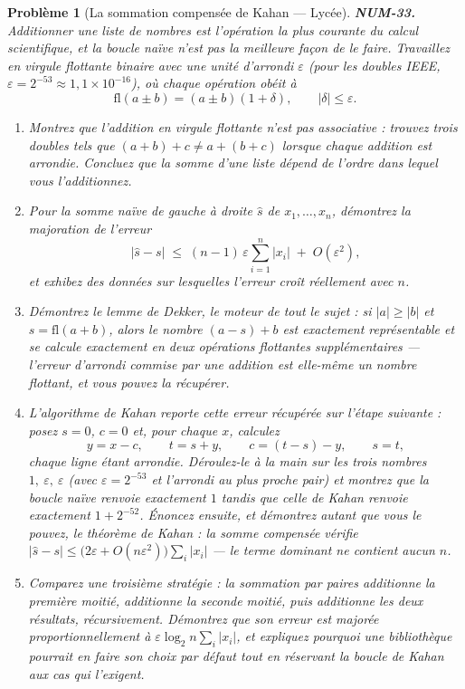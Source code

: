 \documentclass[11pt]{article}
\newtheorem{problem}{Problème}
\begin{document}
\begin{problem}[{La sommation compensée de Kahan --- Lycée}]
\textbf{NUM-33.} Additionner une liste de nombres est l'opération la plus courante du calcul scientifique, et la boucle naïve n'est pas la meilleure façon de le faire. Travaillez en virgule flottante binaire avec une unité d'arrondi $\varepsilon$ (pour les doubles IEEE, $\varepsilon = 2^{-53} \approx 1{,}1 \times 10^{-16}$), où chaque opération obéit à
\[ \mathrm{fl}(a \pm b) = (a \pm b)(1 + \delta), \qquad |\delta| \le \varepsilon . \]
\begin{enumerate}
\item[(a)] Montrez que l'addition en virgule flottante n'est pas associative : trouvez trois doubles tels que $(a + b) + c \ne a + (b + c)$ lorsque chaque addition est arrondie. Concluez que la somme d'une liste dépend de l'ordre dans lequel vous l'additionnez.
\item[(b)] Pour la somme naïve de gauche à droite $\hat{s}$ de $x_1, \ldots, x_n$, démontrez la majoration de l'erreur
\[ |\hat{s} - s| \;\le\; (n-1)\,\varepsilon \sum_{i=1}^{n} |x_i| \;+\; O(\varepsilon^2), \]
et exhibez des données sur lesquelles l'erreur croît réellement avec $n$.
\item[(c)] Démontrez le lemme de Dekker, le moteur de tout le sujet : si $|a| \ge |b|$ et $s = \mathrm{fl}(a + b)$, alors le nombre $(a - s) + b$ est \textit{exactement représentable} et se calcule exactement en deux opérations flottantes supplémentaires --- l'erreur d'arrondi commise par une addition est elle-même un nombre flottant, et vous pouvez la récupérer.
\item[(d)] L'algorithme de Kahan reporte cette erreur récupérée sur l'étape suivante : posez $s = 0$, $c = 0$ et, pour chaque $x$, calculez
\[ y = x - c, \qquad t = s + y, \qquad c = (t - s) - y, \qquad s = t, \]
chaque ligne étant arrondie. Déroulez-le à la main sur les trois nombres $1,\ \varepsilon,\ \varepsilon$ (avec $\varepsilon = 2^{-53}$ et l'arrondi au plus proche pair) et montrez que la boucle naïve renvoie exactement $1$ tandis que celle de Kahan renvoie exactement $1 + 2^{-52}$. Énoncez ensuite, et démontrez autant que vous le pouvez, le théorème de Kahan : la somme compensée vérifie $|\hat{s} - s| \le \big(2\varepsilon + O(n\varepsilon^2)\big)\sum_i |x_i|$ --- le terme dominant ne contient aucun $n$.
\item[(e)] Comparez une troisième stratégie : la sommation par paires additionne la première moitié, additionne la seconde moitié, puis additionne les deux résultats, récursivement. Démontrez que son erreur est majorée proportionnellement à $\varepsilon \log_2 n \sum_i |x_i|$, et expliquez pourquoi une bibliothèque pourrait en faire son choix par défaut tout en réservant la boucle de Kahan aux cas qui l'exigent.
\end{enumerate}

\end{problem}
\end{document}
